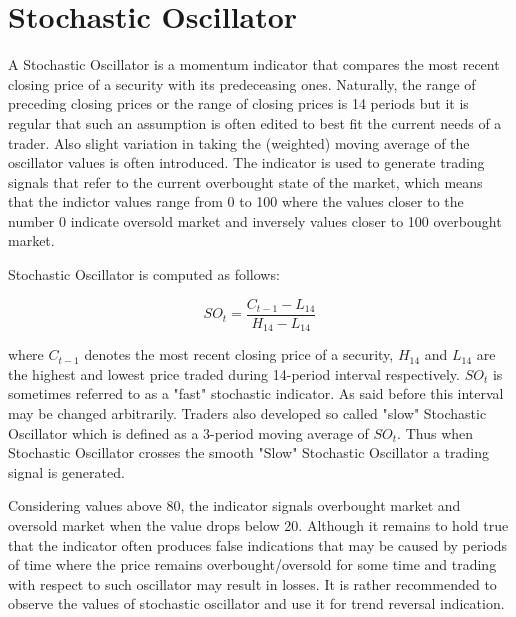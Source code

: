 \section{Stochastic Oscillator}

	A Stochastic Oscillator is a momentum indicator that compares the most recent closing price of a security with its predeceasing ones. Naturally, the range of preceding closing prices or the range of closing prices is 14 periods but it is regular that such an assumption is often edited to best fit the current needs of a trader. Also slight variation in taking the (weighted) moving average of the oscillator values is often introduced. The indicator is used to generate trading signals that refer to the current overbought state of the market, which means that the indictor values range from 0 to 100 where the values closer to the number 0 indicate oversold market and inversely values closer to 100 overbought market. 
	
Stochastic Oscillator is computed as follows:

\begin{equation}
SO_{t} = \frac{C_{t-1} - L_{14}}{H_{14} - L_{14}}
\end{equation}

where $C_{t-1}$ denotes the most recent closing price of a security, $H_{14}$ and $L_{14}$ are the highest and lowest price traded during 14-period interval respectively. $SO_{t}$ is sometimes referred to as a "fast" stochastic indicator. As said before this interval may be changed arbitrarily. Traders also developed so called "slow" Stochastic Oscillator which is defined as a 3-period moving average of $SO_{t}$. Thus when Stochastic Oscillator crosses the smooth "Slow" Stochastic Oscillator a trading signal is generated.

Considering values above 80, the indicator signals overbought market and oversold market when the value drops below 20. Although it remains to hold true that the indicator often produces false indications that may be caused by periods of time where the price remains overbought/oversold for some time and trading with respect to such oscillator may result in losses. It is rather recommended to observe the values of stochastic oscillator and use it for trend reversal indication. 

